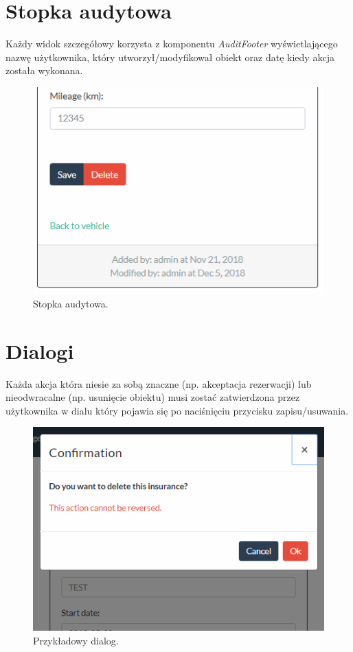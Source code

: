 \documentclass[eng,printmode,openany]{mgr}
\begin{document}
	\newpage
	\section{Stopka audytowa}
	Każdy widok szczegółowy korzysta z komponentu \textit{AuditFooter} wyświetlającego nazwę użytkownika, który utworzył/modyfikował obiekt oraz datę kiedy akcja została wykonana.
	
	\begin{figure}[H]
		\centering
		\includegraphics[scale=0.5]{images/insurance_footer.png}
		\caption{Stopka audytowa.}
	\end{figure}

	\section{Dialogi}
	Każda akcja która niesie za sobą znaczne (np. akceptacja rezerwacji) lub nieodwracalne (np. usunięcie obiektu) musi zostać zatwierdzona przez użytkownika w dialu który pojawia się po naciśnięciu przycisku zapisu/usuwania.
	
	\begin{figure}[H]
		\centering
		\includegraphics[scale=0.7]{images/insurance_confirmation.png}
		\caption{Przykładowy dialog.}
	\end{figure}
	
\end{document}
